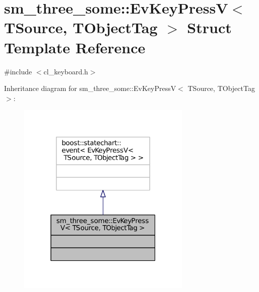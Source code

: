 \hypertarget{structsm__three__some_1_1EvKeyPressV}{}\section{sm\+\_\+three\+\_\+some\+:\+:Ev\+Key\+PressV$<$ T\+Source, T\+Object\+Tag $>$ Struct Template Reference}
\label{structsm__three__some_1_1EvKeyPressV}


{\ttfamily \#include $<$cl\+\_\+keyboard.\+h$>$}



Inheritance diagram for sm\+\_\+three\+\_\+some\+:\+:Ev\+Key\+PressV$<$ T\+Source, T\+Object\+Tag $>$\+:
\nopagebreak
\begin{figure}[H]
\begin{center}
\leavevmode
\includegraphics[width=235pt]{structsm__three__some_1_1EvKeyPressV__inherit__graph}
\end{center}
\end{figure}


